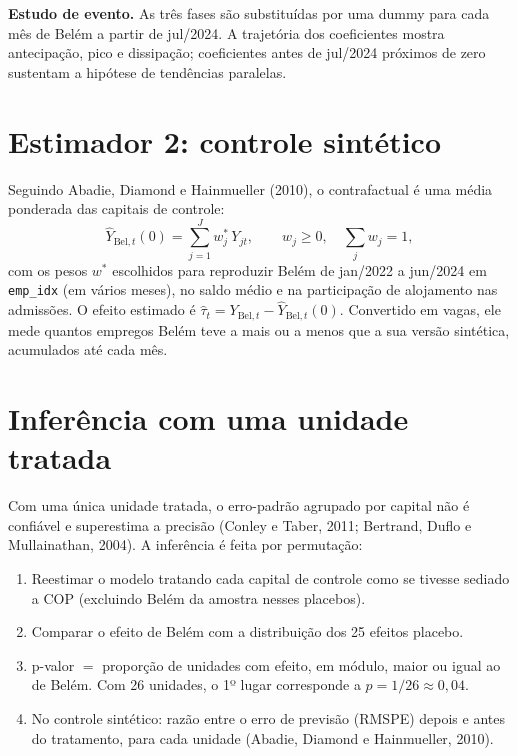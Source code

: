 \documentclass[11pt,a4paper]{article}
\newcommand{\var}[1]{\texttt{#1}}
\begin{document}
\textbf{Estudo de evento.} As três fases são substituídas por uma dummy para cada mês de Belém a partir
de jul/2024. A trajetória dos coeficientes mostra antecipação, pico e dissipação; coeficientes antes de
jul/2024 próximos de zero sustentam a hipótese de tendências paralelas.

\section{Estimador 2: controle sintético}

Seguindo Abadie, Diamond e Hainmueller (2010), o contrafactual é uma média ponderada das capitais de
controle:
\begin{equation}
\hat Y_{\text{Bel},t}(0) = \sum_{j=1}^{J} w_j^{*}\, Y_{jt}, \qquad w_j \geq 0,\quad \sum_j w_j = 1,
\end{equation}
com os pesos $w^{*}$ escolhidos para reproduzir Belém de jan/2022 a jun/2024 em \var{emp\_idx} (em
vários meses), no saldo médio e na participação de alojamento nas admissões. O efeito estimado é
$\hat\tau_t = Y_{\text{Bel},t} - \hat Y_{\text{Bel},t}(0)$. Convertido em vagas, ele mede quantos
empregos Belém teve a mais ou a menos que a sua versão sintética, acumulados até cada mês.

\section{Inferência com uma unidade tratada}

Com uma única unidade tratada, o erro-padrão agrupado por capital não é confiável e superestima a
precisão (Conley e Taber, 2011; Bertrand, Duflo e Mullainathan, 2004). A inferência é feita por
permutação:

\begin{enumerate}[leftmargin=*]
  \item Reestimar o modelo tratando cada capital de controle como se tivesse sediado a COP (excluindo
        Belém da amostra nesses placebos).
  \item Comparar o efeito de Belém com a distribuição dos 25 efeitos placebo.
  \item p-valor $=$ proporção de unidades com efeito, em módulo, maior ou igual ao de Belém. Com 26
        unidades, o 1º lugar corresponde a $p = 1/26 \approx 0{,}04$.
  \item No controle sintético: razão entre o erro de previsão (RMSPE) depois e antes do tratamento,
        para cada unidade (Abadie, Diamond e Hainmueller, 2010).
\end{enumerate}
\end{document}
